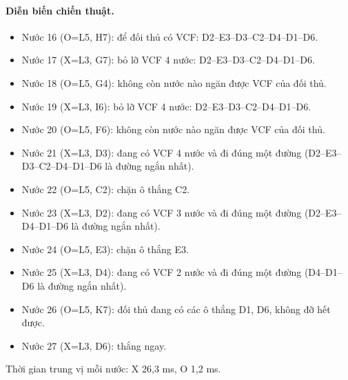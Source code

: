 \paragraph{Diễn biến chiến thuật.}
\begin{itemize}\small
\setlength{\itemsep}{0pt}
  \item Nước 16 (O=L5, H7): để đối thủ có VCF: D2--E3--D3--C2--D4--D1--D6.
  \item Nước 17 (X=L3, G7): bỏ lỡ VCF 4 nước: D2--E3--D3--C2--D4--D1--D6.
  \item Nước 18 (O=L5, G4): không còn nước nào ngăn được VCF của đối thủ.
  \item Nước 19 (X=L3, I6): bỏ lỡ VCF 4 nước: D2--E3--D3--C2--D4--D1--D6.
  \item Nước 20 (O=L5, F6): không còn nước nào ngăn được VCF của đối thủ.
  \item Nước 21 (X=L3, D3): đang có VCF 4 nước và đi đúng một đường (D2--E3--D3--C2--D4--D1--D6 là đường ngắn nhất).
  \item Nước 22 (O=L5, C2): chặn ô thắng C2.
  \item Nước 23 (X=L3, D2): đang có VCF 3 nước và đi đúng một đường (D2--E3--D4--D1--D6 là đường ngắn nhất).
  \item Nước 24 (O=L5, E3): chặn ô thắng E3.
  \item Nước 25 (X=L3, D4): đang có VCF 2 nước và đi đúng một đường (D4--D1--D6 là đường ngắn nhất).
  \item Nước 26 (O=L5, K7): đối thủ đang có các ô thắng D1, D6, không đỡ hết được.
  \item Nước 27 (X=L3, D6): thắng ngay.
\end{itemize}
Thời gian trung vị mỗi nước: X 26,3 ms, O 1,2 ms.
\clearpage

